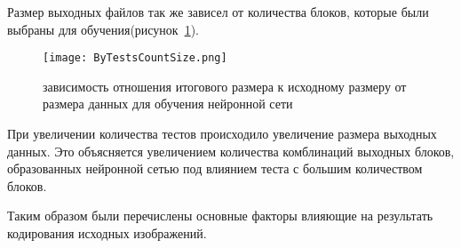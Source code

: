 Размер выходных файлов так же зависел от количества блоков, которые были выбраны для обучения(рисунок~\ref{fig:by_tests_count_size}).

\begin{figure}[ht]
\centering
  \texttt{[image: ByTestsCountSize.png]}
  \caption{ зависимость отношения итогового размера к исходному размеру от размера данных для обучения нейронной сети }
  \label{fig:by_tests_count_size}
\end{figure}

При увеличении количества тестов происходило увеличение размера выходных данных. Это объясняется увеличением количества комблинаций выходных блоков,
образованных нейронной сетью под влиянием теста с большим количеством блоков.

Таким образом были перечислены основные факторы влияющие на результать кодирования исходных изображений.
